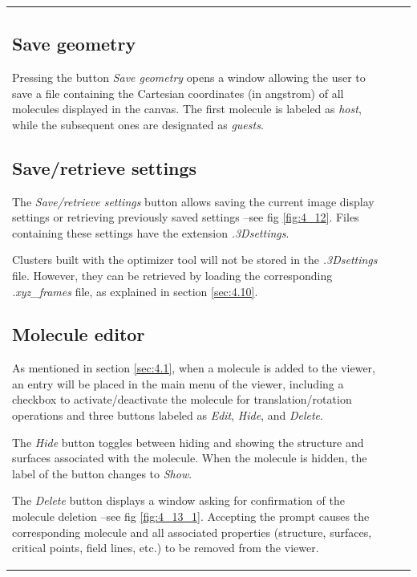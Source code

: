 \documentclass[10pt]{article}
\begin{document}
\begin{tabular}{lcr}
\hspace*{-3mm}
\begin{minipage}{.5\linewidth}
\subsection{Save geometry \label{sec:4.11}\index{3D graphics!geometry saving}}

Pressing the button {\it Save geometry}\index{save geometry}  
opens a window allowing the user to save a file containing the Cartesian  
coordinates (in angstrom) of all molecules displayed in the canvas.  
The first molecule is labeled as {\it host}, while the subsequent ones  
are designated as {\it guests}.

\subsection{Save/retrieve settings \label{sec:4.12}\index{3D graphics!save/retrieve settings}}

The {\it Save/retrieve settings}\index{save settings}\index{retrieve settings} button allows saving the current image display settings  
or retrieving previously saved settings --see fig \ref{fig:4_12}.  
Files containing these settings have the extension {\it .3Dsettings}.  

Clusters built with the optimizer tool will not be stored in the  
{\it *.3Dsettings} file. However, they can be retrieved\index{3D graphics!clusters retrieve}  
by loading the corresponding {\it *.xyz\_frames} file, as explained in section \ref{sec:4.10}.


\subsection{Molecule editor \label{sec:4.13}\index{3D graphics!molecule editor}}

As mentioned in section \ref{sec:4.1}, when a molecule is added to the viewer,  
an entry will be placed in the main menu of the viewer, including a checkbox to  
activate/deactivate the molecule for translation/rotation operations and three buttons  
labeled as {\it Edit}, {\it Hide}, and {\it Delete}.  

The {\it Hide} button toggles between hiding and showing the structure and  
surfaces associated with the molecule. When the molecule is hidden,  
the label of the button changes to {\it Show}.

The {\it Delete} button displays a window asking for confirmation  
of the molecule deletion --see fig \ref{fig:4_13_1}. Accepting the prompt causes the corresponding molecule  
and all associated properties (structure, surfaces, critical points, field lines, etc.)  
to be removed from the viewer.  


\end{minipage}
\end{tabular}
\end{document}
